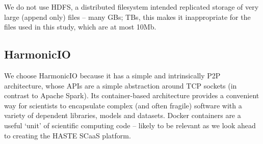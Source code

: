 \documentclass[conference]{IEEEtran}
\begin{document}
We do not use HDFS, a distributed filesystem intended replicated storage of very large (append only) files -- many GBs; TBs, this makes it inappropriate for the files used in this study, which are at most 10Mb. 



\subsection{HarmonicIO}
We choose HarmonicIO because it has a simple and intrinsically P2P architecture, whose APIs are a simple abstraction around TCP sockets (in contrast to Apache Spark). Its container-based architecture provides a convenient way for scientists to encapsulate complex (and often fragile) software with a variety of dependent libraries, models and datasets. Docker containers are a useful `unit' of scientific computing code -- likely to be relevant as we look ahead to creating the HASTE SCaaS platform.
\end{document}
